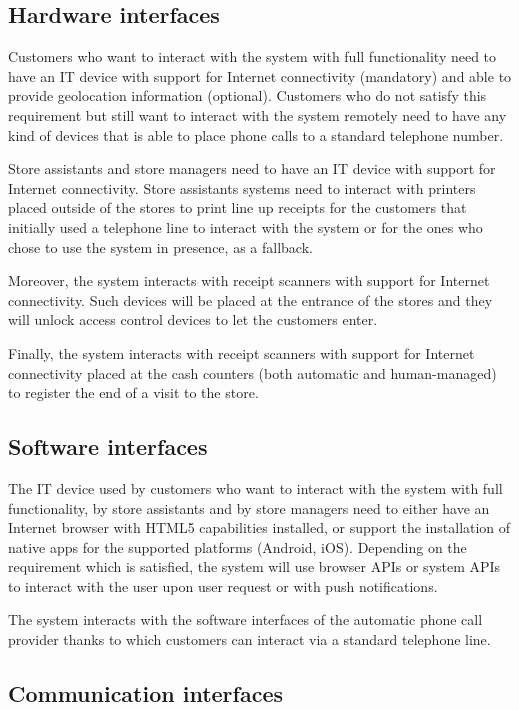 \documentclass[../../main.tex]{subfiles}
\begin{document}
\subsection{Hardware interfaces}

Customers who want to interact with the system with full functionality need to
have an IT device with support for Internet connectivity (mandatory) and able to
provide geolocation information (optional). Customers who do not satisfy this
requirement but still want to interact with the system remotely need to have any
kind of devices that is able to place phone calls to a standard telephone
number.

Store assistants and store managers need to have an IT device with support for
Internet connectivity. Store assistants systems need to interact with printers
placed outside of the stores to print line up receipts for the customers that
initially used a telephone line to interact with the system or for the ones who
chose to use the system in presence, as a fallback.

Moreover, the system interacts with receipt scanners with support for Internet
connectivity. Such devices will be placed at the entrance of the stores and they
will unlock access control devices to let the customers enter. 

Finally, the system interacts with receipt scanners with support for Internet
connectivity placed at the cash counters (both automatic and human-managed) to
register the end of a visit to the store.

\subsection{Software interfaces}

The IT device used by customers who want to interact with the system with full
functionality, by store assistants and by store managers need to either have an
Internet browser with HTML5 capabilities installed, or support the installation
of native apps for the supported platforms (Android, iOS). Depending on the
requirement which is satisfied, the system will use browser APIs or system APIs
to interact with the user upon user request or with push notifications.

The system interacts with the software interfaces of the automatic phone call
provider thanks to which customers can interact via a standard telephone line.

\subsection{Communication interfaces}
\end{document}
